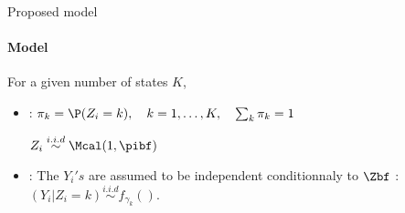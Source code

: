 \begin{frame}[fragile]{Proposed model}
\paragraph{Model}
For a given number of states $K$, 
\begin{itemize}
\item
 : $\pi_k=\P(Z_i=k), \quad k=1,\ldots, K, \quad \sum_k \pi_k=1$\par
 $Z_i \overset{i.i.d}{\sim} \Mcal(1, \pibf)$
 \item {}: The $Y_i's$ are assumed to be independent  conditionnaly to $\Zbf$ : $(Y_i\vert Z_i = k) \overset{i.i.d}{\sim} f_{\gamma_k}().$
\end{itemize}
\begin{columns}
  \begin{column}{0.45\textwidth}
\begin{knitrout}
\color{fgcolor}\begin{kframe}
\begin{alltt}
 \hlkwb{<-}  \hlkwb{<-}  \hlkwb{<-} \hlstd{(}\hlstd{,}  \hlkwb{<-} \hlstd{(}\hlstd{,}\hlstd{)}
 \hlkwb{<-} \hlstd{(}\hlopt{:}\hlstd{,}    \hlstd{=}\hlstd{(}\hlstd{,} \hlstd{))}
 \hlopt{+}\hlstd{,} \hlstd{=}\hlstd{,} \hlstd{=}\hlstd{)}
 \hlkwb{<-}   
 \hlopt{+}\hlstd{,} \hlstd{=}\hlstd{)}
\end{alltt}
\end{kframe}
\end{knitrout}
 \end{column}
  \begin{column}{0.45\textwidth}
  \end{column}
  \end{columns}
\end{frame}

